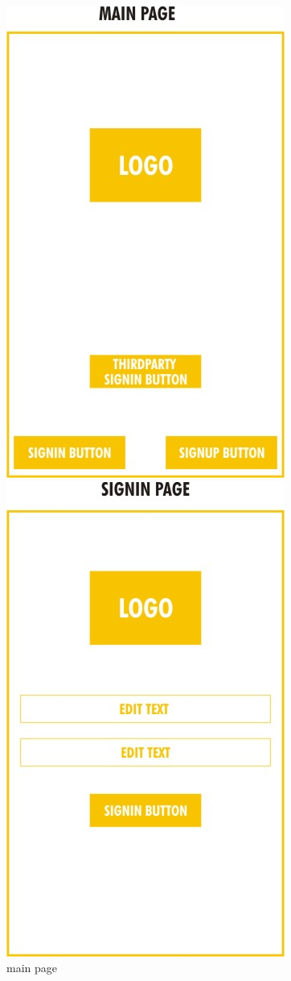 \documentclass[12pt]{article}
\begin{document}
\begin{figure}
\centering
\includegraphics[scale=0.4]{milestone2/4.jpeg}
\caption{main page}
\includegraphics[scale=0.4]{milestone2/5.jpeg}

\end{figure}
\end{document}
